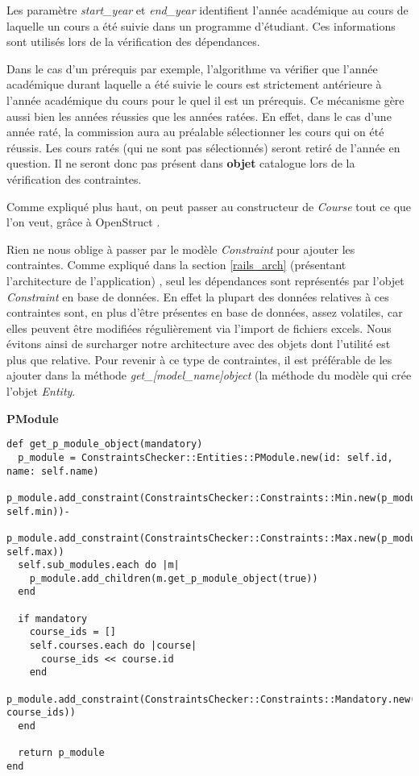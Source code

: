 Les paramètre \textit{start\_year} et \textit{end\_year} identifient l'année académique au cours de laquelle un cours a été suivie dans un programme d'étudiant. Ces informations sont utilisés lors de la vérification des dépendances. 

Dans le cas d'un prérequis  par exemple, l'algorithme va vérifier que l'année académique durant laquelle a été suivie le cours est strictement antérieure à l'année académique du cours pour le quel il est un prérequis. Ce mécanisme gère aussi bien les années réussies que les années ratées. En effet, dans le cas d'une année raté, la commission aura au préalable sélectionner les cours qui on été réussis. Les cours ratés (qui ne sont pas sélectionnés) seront retiré de l'année en question. Il ne seront donc pas présent dans \textbf{objet} catalogue lors de la vérification des contraintes. 

Comme expliqué plus haut, on peut passer au constructeur de \textit{Course} tout ce que l'on veut, grâce à OpenStruct \cite{OpenStruct}.

Rien ne nous oblige à passer par le modèle \textit{Constraint} pour ajouter les contraintes. Comme expliqué dans la section \ref{rails_arch} (présentant l'architecture de l'application) , seul les dépendances sont représentés par l'objet \textit{Constraint} en base de données. En effet la plupart des données relatives à ces contraintes sont, en plus d'être présentes en base de données, assez volatiles, car elles peuvent être modifiées régulièrement via l'import de fichiers excels. Nous évitons ainsi de surcharger notre architecture avec des objets dont l'utilité est plus que relative. Pour revenir à ce type de contraintes, il est préférable de les ajouter dans la méthode \textit{get\_[model\_name]object} (la méthode du modèle qui crée l'objet \textit{Entity}.

\textbf{PModule}

\begin{lstlisting}
def get_p_module_object(mandatory)
  p_module = ConstraintsChecker::Entities::PModule.new(id: self.id, name: self.name)
  p_module.add_constraint(ConstraintsChecker::Constraints::Min.new(p_module, self.min))-
  p_module.add_constraint(ConstraintsChecker::Constraints::Max.new(p_module, self.max))
  self.sub_modules.each do |m|
    p_module.add_children(m.get_p_module_object(true))
  end

  if mandatory
    course_ids = []
    self.courses.each do |course|
      course_ids << course.id
    end
    p_module.add_constraint(ConstraintsChecker::Constraints::Mandatory.new(p_module, course_ids))
  end

  return p_module
end
\end{lstlisting}

